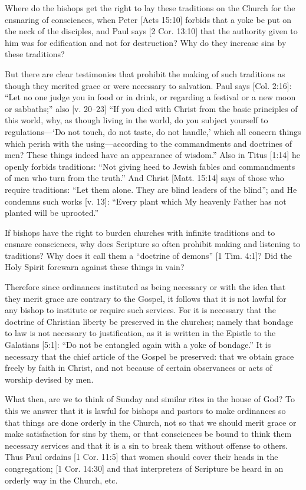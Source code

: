 Where do the bishops get the right to lay these traditions on the Church for the ensnaring of consciences, when Peter [Acts 15:10] forbids that a yoke be put on the neck of the disciples, and Paul says [2 Cor. 13:10] that the authority given to him was for edification and not for destruction? Why do they increase sins by these traditions?

But there are clear testimonies that prohibit the making of such traditions as though they merited grace or were necessary to salvation. Paul says [Col. 2:16]: “Let no one judge you in food or in drink, or regarding a festival or a new moon or sabbaths;” also [v. 20–23] “If you died with Christ from the basic principles of this world, why, as though living in the world, do you subject yourself to regulations—‘Do not touch, do not taste, do not handle,’ which all concern things which perish with the using—according to the commandments and doctrines of men? These things indeed have an appearance of wisdom.” Also in Titus [1:14] he openly forbids traditions: “Not giving heed to Jewish fables and commandments of men who turn from the truth.” And Christ [Matt. 15:14] says of those who require traditions: “Let them alone. They are blind leaders of the blind”; and He condemns such works [v. 13]: “Every plant which My heavenly Father has not planted will be uprooted.”

If bishops have the right to burden churches with infinite traditions and to ensnare consciences, why does Scripture so often prohibit making and listening to traditions? Why does it call them a “doctrine of demons” [1 Tim. 4:1]? Did the Holy Spirit forewarn against these things in vain?

Therefore since ordinances instituted as being necessary or with the idea that they merit grace are contrary to the Gospel, it follows that it is not lawful for any bishop to institute or require such services. For it is necessary that the doctrine of Christian liberty be preserved in the churches; namely that bondage to law is not necessary to justification, as it is written in the Epistle to the Galatians [5:1]: “Do not be entangled again with a yoke of bondage.” It is necessary that the chief article of the Gospel be preserved: that we obtain grace freely by faith in Christ, and not because of certain observances or acts of worship devised by men.

What then, are we to think of Sunday and similar rites in the house of God? To this we answer that it is lawful for bishops and pastors to make ordinances so that things are done orderly in the Church, not so that we should merit grace or make satisfaction for sins by them, or that consciences be bound to think them necessary services and that it is a sin to break them without offense to others. Thus Paul ordains [1 Cor. 11:5] that women should cover their heads in the congregation; [1 Cor. 14:30] and that interpreters of Scripture be heard in an orderly way in the Church, etc.

